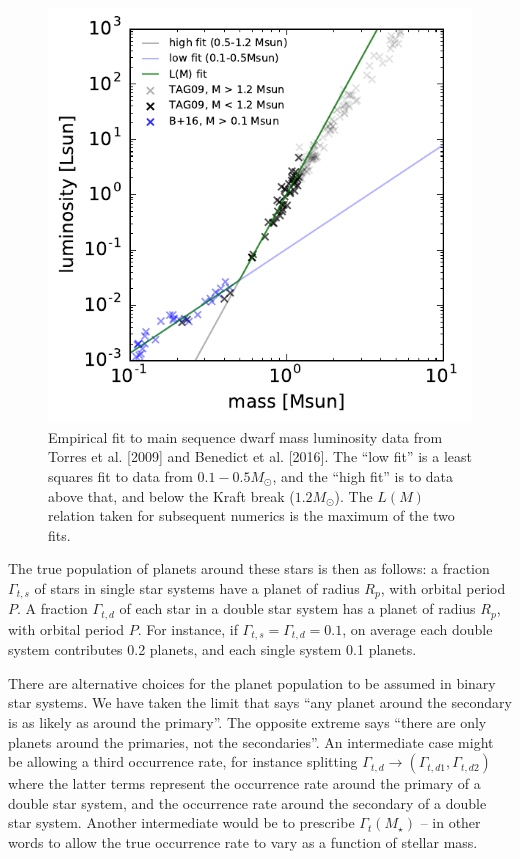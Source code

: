 \documentclass{emulateapj}
\begin{document}
\begin{figure}
	\begin{center}
		\includegraphics[scale=0.9]{figures/mass_luminosity.pdf}
	\end{center}
	\caption{Empirical fit to main sequence dwarf mass luminosity data from 
	Torres et al. [2009] and Benedict et al. [2016]. The ``low fit'' is a least 
	squares fit to data from $0.1-0.5M_\odot$, and the ``high fit'' is to data 
	above that, and below the Kraft break ($1.2M_\odot$).
	The $L(M)$ relation taken for subsequent numerics is the maximum 
	of the two fits.
	}
	\label{fig:mass_luminosity}
\end{figure}


The true population of planets around these stars is then as follows:
a fraction $\Gamma_{t,s}$ of stars in single star systems 
	have a planet of radius $R_p$, with orbital period $P$.
A fraction $\Gamma_{t,d}$ of each star in a double star 
	system has a planet of radius $R_p$, with orbital period $P$. For instance, 
	if $\Gamma_{t,s} = \Gamma_{t,d} = 0.1$, on average each double 
	system contributes 0.2 planets, and each single system 0.1 planets.

There are alternative choices for the planet population to be assumed in binary 
star systems.
We have taken the limit that says ``any planet around the secondary is as 
likely as around the primary''.
The opposite extreme says ``there are only planets around the primaries, not the 
secondaries''.
An intermediate case might be allowing a third occurrence rate, for instance 
splitting $\Gamma_{t,d} \rightarrow (\Gamma_{t,d1}, \Gamma_{t,d2})$ where the 
latter terms represent the occurrence rate around the primary of a double star 
system, and the occurrence rate around the secondary of a double star system.
Another intermediate would be to prescribe $\Gamma_{t}(M_\star)$ -- in other 
words to allow the true occurrence rate to vary as a function of stellar mass.
\end{document}
